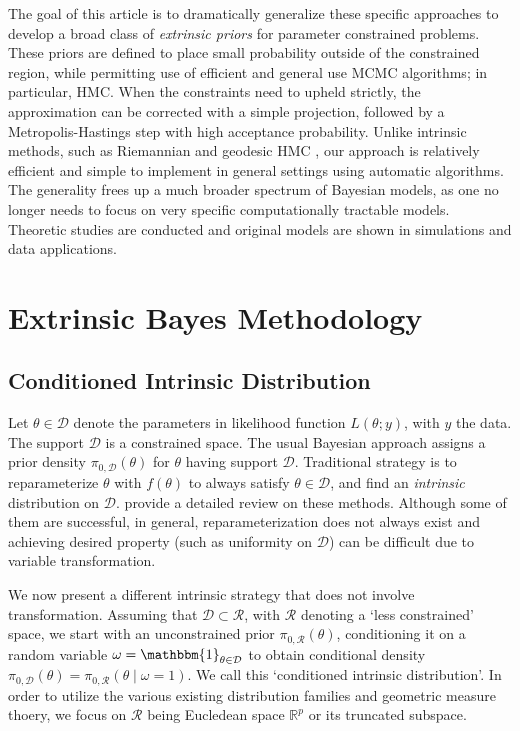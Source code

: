 \documentclass[10pt]{article}
\newcommand{\mc}[1]{\mathcal{#1}}
\DeclareMathOperator{\1}{\mathbbm{1}}
\begin{document}
The goal of this article is to dramatically generalize these specific approaches to develop a broad class of {\em extrinsic priors} for parameter constrained problems. These priors are defined to place small probability outside of the constrained region, while permitting use of efficient and general use MCMC algorithms; in particular, HMC. When the constraints need to upheld strictly, the approximation can be corrected with a simple projection, followed by a Metropolis-Hastings step with high acceptance probability.
Unlike intrinsic methods, such as Riemannian and geodesic HMC \citep{girolami2011riemann,byrne2013geodesic}, our approach is
relatively efficient and simple to implement in general settings using automatic algorithms. The generality frees up a much broader spectrum of Bayesian models, as one no longer needs to focus on very specific computationally tractable models.
Theoretic studies are conducted and original models are shown in simulations and data applications.

\section{Extrinsic Bayes Methodology}


\subsection{Conditioned Intrinsic Distribution}

Let $\theta \in \mc D$ denote the parameters in likelihood function $L(\theta;y)$, with $y$ the data. The support $\mc D$ is a constrained space. The usual Bayesian approach assigns a prior density $\pi_{0,\mc D}(\theta)$ for $\theta$ having support $\mc D$. Traditional strategy is to reparameterize $\theta$ with $f(\theta)$ to always satisfy $\theta \in \mc D$, and find an {\it intrinsic} distribution on $\mc D$. \cite{diaconis2013manifold} provide a detailed review on these methods. Although some of them are successful, in general, reparameterization does not always exist and achieving desired property (such as uniformity on $\mc D$) can be difficult due to variable transformation.

We now present a different intrinsic strategy that does not involve transformation. Assuming that $\mc D \subset \mc R$, with $\mc R$ denoting a `less constrained' space, we start with an unconstrained prior $\pi_{0,\mc R}(\theta)$, conditioning it on a random variable $\omega=\mathbbm{1}_{\theta\in \mc D}$ to obtain conditional density $\pi_{0,\mc D}(\theta)= \pi_{0,\mc R}(\theta \mid \omega=1)$. We call this `conditioned intrinsic distribution'. In order to utilize the various existing distribution families and geometric measure thoery, we focus on $\mc R$ being Eucledean space $\mathbb{R}^{p}$ or its truncated subspace.
\end{document}
